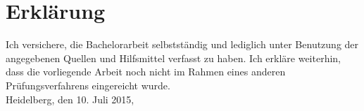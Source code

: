 \chapter*{Erklärung}

Ich versichere, die Bachelorarbeit selbstständig und lediglich unter Benutzung der angegebenen Quellen und Hilfsmittel verfasst zu haben. Ich erkläre weiterhin, dass die vorliegende Arbeit noch nicht im Rahmen eines anderen Prüfungsverfahrens eingereicht wurde.\\

Heidelberg, den 10. Juli 2015,


